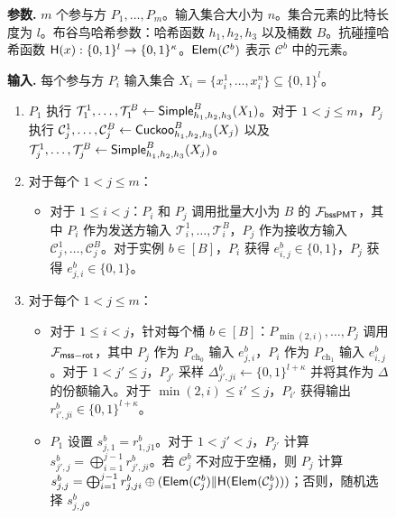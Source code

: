 \begin{figure}[!htb]
\begin{framed}
\begin{minipage}[center]{\textwidth}
\begin{trivlist}
\item \textbf{参数.} $m$ 个参与方 $P_1, \dots, P_m$。输入集合大小为 $n$。集合元素的比特长度为 $l$。布谷鸟哈希参数：哈希函数 $h_1, h_2, h_3$ 以及桶数 $B$。抗碰撞哈希函数 $\mathsf{H}(x): \{0,1\}^l \to \{0,1\}^{\kappa}$。$\mathsf{Elem}(\mathcal{C}^b)$ 表示 $\mathcal{C}^b$ 中的元素。
\item \textbf{输入.} 每个参与方 $P_i$ 输入集合 $X_i = \{x_i^1, \dots, x_i^n\} \subseteq \{0,1\}^l$。
\begin{enumerate} [itemsep=2pt,topsep=0pt,parsep=0pt]
\item $P_1$ 执行 $\mathcal{T}_1^1, \dots, \mathcal{T}_1^B \gets \mathsf{Simple}_{h_1,h_2,h_3}^B(X_1)$。对于 $1 < j \le m $，$P_j$ 执行 $\mathcal{C}_j^1, \dots, \mathcal{C}_j^B \gets \mathsf{Cuckoo}_{h_1,h_2,h_3}^B(X_j)$ 以及 $\mathcal{T}_j^1, \dots, \mathcal{T}_j^B \gets \mathsf{Simple}_{h_1,h_2,h_3}^B(X_j)$。
\item 对于每个 $1 < j \le m$：
\begin{itemize} [itemsep=1pt,topsep=0pt,parsep=0pt,leftmargin=10pt]
  \item[-] 对于 $1 \le i < j$：$P_i$ 和 $P_j$ 调用批量大小为 $B$ 的 $\mathcal{F}_\mathsf{bssPMT}$，其中 $P_i$ 作为发送方输入 $\mathcal{T}_i^1, \dots, \mathcal{T}_i^B$，$P_j$ 作为接收方输入 $\mathcal{C}_j^1, \dots, \mathcal{C}_j^B$。对于实例 $b \in [B]$，$P_i$ 获得 $e_{i,j}^b \in \{0,1\}$，$P_j$ 获得 $e_{j,i}^b \in \{0,1\}$。
\end{itemize}
\item 对于每个 $1 < j \le m$：
\begin{itemize} [itemsep=1pt,topsep=0pt,parsep=0pt,leftmargin=10pt]
  \item[-] 对于 $1 \le i < j$，针对每个桶 $b \in [B]$：$P_{\min(2,i)}, \dots, P_j$ 调用 $\mathcal{F}_\mathsf{mss\mathsf{-}rot}$，其中 $P_j$ 作为 $P_{\text{ch}_0}$ 输入 $e_{j,i}^b$，$P_i$ 作为 $P_{\text{ch}_1}$ 输入 $e_{i,j}^b$。对于 $1 < j' \le j$，$P_{j'}$ 采样 $\Delta_{j',ji}^b \gets \{0,1\}^{l+\kappa}$ 并将其作为 $\Delta$ 的份额输入。对于 $\min(2,i) \le i' \le j$，$P_{i'}$ 获得输出 $r_{i',ji}^b \in \{0,1\}^{l+\kappa}$。
  \item[-] $P_1$ 设置 $s_{j,1}^b = r_{1,j1}^b$。对于 $1 < j' < j$，$P_{j'}$ 计算 $s_{j',j}^b = \bigoplus_{i=1}^{j-1} r_{j',ji}^b$。若 $\mathcal{C}_j^b$ 不对应于空桶，则 $P_j$ 计算 $s_{j,j}^b = \bigoplus_{i=1}^{j-1} r_{j,ji}^b \oplus (\mathsf{Elem}(\mathcal{C}_j^b) \Vert \mathsf{H}(\mathsf{Elem}(\mathcal{C}_j^b)))$；否则，随机选择 $s_{j,j}^b$。

\end{itemize}
\end{enumerate}
\end{trivlist}
\end{minipage}
\end{framed}
\end{figure}
